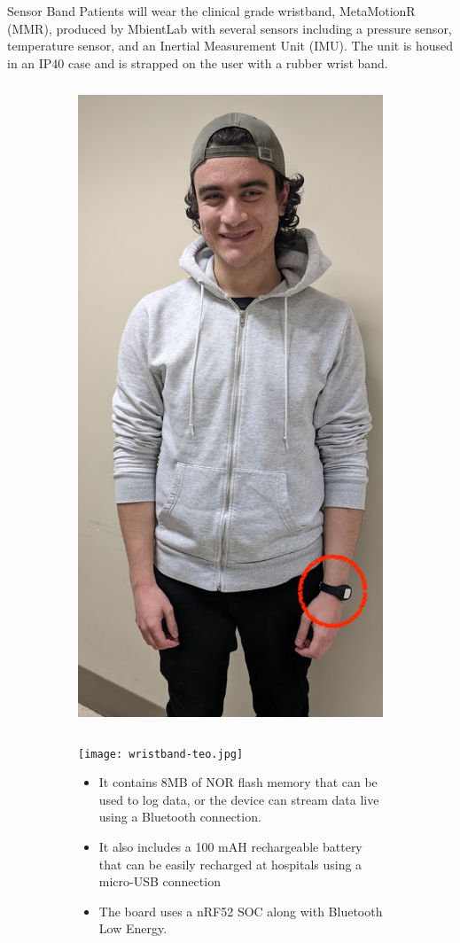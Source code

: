 \documentclass[22pt]{beamer}
\begin{document}
\begin{frame}[fragile]
\begin{textblock}{7.25}
\begin{block}{Sensor Band}
Patients will wear the clinical grade wristband, MetaMotionR (MMR), produced by MbientLab with several sensors including a pressure sensor, temperature sensor, and an Inertial Measurement Unit (IMU). The unit is housed in an IP40 case and is strapped on the user with a rubber wrist band.

\begin{figure}
\begin{subfigure}{0.3\textwidth}
\includegraphics[height=19.2cm,width=12cm]{teo-standing.png}
\end{subfigure}
\begin{subfigure}{0.65\textwidth}
\centerline{\texttt{[image: wristband-teo.jpg]}}
\begin{itemize}
\item It contains 8MB of NOR flash memory that can be used to log data, or the device can stream data live using a Bluetooth connection.
\item It also includes a 100 mAH rechargeable battery that can be easily recharged at hospitals using a micro-USB connection
\item The board uses a nRF52 SOC along with Bluetooth Low Energy. 
\end{itemize}


\end{subfigure}
\end{figure}
\end{block}
\end{textblock}
\end{frame}
\end{document}

